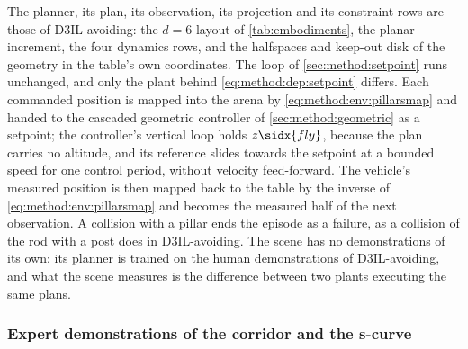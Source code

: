 The planner, its plan, its observation, its projection and its constraint rows are those of D3IL-avoiding:
the $d = 6$ layout of \autoref{tab:embodiments}, the planar increment, the four dynamics rows, and the
halfspaces and keep-out disk of the geometry in the table's own coordinates. The loop of
\autoref{sec:method:setpoint} runs unchanged, and only the plant behind \eqref{eq:method:dep:setpoint}
differs. Each commanded position is mapped into the arena by \eqref{eq:method:env:pillarsmap} and handed
to the cascaded geometric controller of \autoref{sec:method:geometric} as a setpoint; the controller's
vertical loop holds $z\sidx{fly}$, because the plan carries no altitude, and its reference slides towards
the setpoint at a bounded speed for one control period, without velocity feed-forward. The vehicle's
measured position is then mapped back to the table by the inverse of \eqref{eq:method:env:pillarsmap}
and becomes the measured half of the next observation. A collision with a pillar ends the episode as a
failure, as a collision of the rod with a post does in D3IL-avoiding. The scene has no demonstrations of its own:
its planner is trained on the human demonstrations of D3IL-avoiding, and what the scene measures is the
difference between two plants executing the same plans.

\subsubsection*{Expert demonstrations of the corridor and the s-curve}

